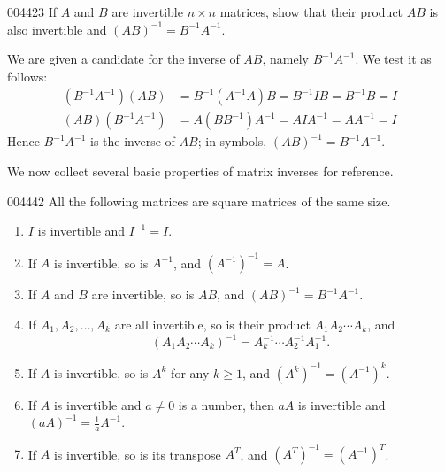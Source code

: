 \begin{example}{}{004423}
If $A$ and $B$ are invertible $n \times n$ matrices, show that their product $AB$ is also invertible and $(AB)^{-1} = B^{-1}A^{-1}$.

\begin{solution}
  We are given a candidate for the inverse of $AB$, namely $B^{-1}A^{-1}$. We test it as follows:
\begin{align*}
(B^{-1}A^{-1})(AB) &= B^{-1}(A^{-1}A)B = B^{-1}IB = B^{-1}B = I \\
(AB)(B^{-1}A^{-1}) &= A(BB^{-1})A^{-1} = AIA^{-1} = AA^{-1} = I
\end{align*}
Hence $B^{-1}A^{-1}$ is the inverse of $AB$; in symbols, $(AB)^{-1} = B^{-1}A^{-1}$.
\end{solution}
\end{example}

We now collect several basic properties of matrix inverses for reference.

\begin{theorem}{}{004442}
All the following matrices are square matrices of the same size.

\begin{enumerate}
\item $I$ is invertible and $I^{-1} = I$.

\item If $A$ is invertible, so is $A^{-1}$, and $(A^{-1})^{-1} = A$.

\item If $A$ and $B$ are invertible, so is $AB$, and $(AB)^{-1} = B^{-1}A^{-1}$.

\item If $A_{1}, A_{2}, \dots, A_{k}$ are all invertible, so is their product $A_{1}A_{2} \cdots A_{k}$, and 
\begin{equation*}
(A_{1}A_{2} \cdots A_{k})^{-1} = A_{k}^{-1} \cdots A_{2}^{-1}A_{1}^{-1}.
\end{equation*}

\item If $A$ is invertible, so is $A^k$ for any $k \geq 1$, and $(A^{k})^{-1} = (A^{-1})^{k}$.

\item If $A$ is invertible and $a \neq 0$ is a number, then $aA$ is invertible and $(aA)^{-1} = \frac{1}{a}A^{-1}$.

\item If $A$ is invertible, so is its transpose $A^{T}$, and $(A^{T})^{-1} = (A^{-1})^{T}$.

\end{enumerate}
\end{theorem}

